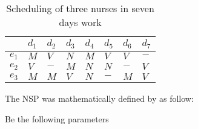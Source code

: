 \begin{table}[ht]
 \centering
\caption{Scheduling of three nurses in seven days work\label{enfermeira_dia}}
\begin{tabular}{r|l|l|l|l|l|l|l}
         & $d_1$ & $d_2$ & $d_3$ & $d_4$ & $d_5$ & $d_6$ & $d_7$ \\ \hline
 $e_1$ & $M$  & $V$  & $N$  & $M$  & $V$  & $V$  & $-$ \\ \hline
 $e_2$ & $V$  & $-$  & $M$  & $N$  & $N$  & $-$  & $V$\\ \hline
 $e_3$ & $M$  & $M$  & $V$  & $N$  & $-$  & $M$  & $V$
\end{tabular}
\end{table}

The \ac{NSP} was mathematically defined by  as follow:

Be the following parameters


